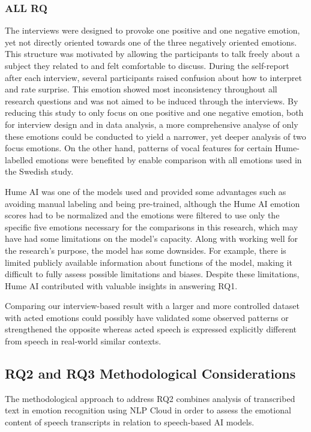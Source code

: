 \subsubsection{ALL RQ } 
The interviews were designed to provoke one positive and one negative emotion, yet not directly oriented towards one of the three negatively oriented emotions. This structure was motivated by allowing the participants to talk freely about a subject they related to and felt comfortable to discuss. During the self-report after each interview, several participants raised confusion about how to interpret and rate surprise. This emotion showed most inconsistency throughout all research questions and was not aimed to be induced through the interviews. By reducing this study to only focus on one positive and one negative emotion, both for interview design and in data analysis, a more comprehensive analyse of only these emotions could be conducted to yield a narrower, yet deeper analysis of two focus emotions. On the other hand, patterns of vocal features for certain Hume-labelled emotions were benefited by enable comparison with all emotions used in the Swedish study. 

Hume AI was one of the models used and provided some advantages such as avoiding manual
labeling and being pre-trained, although the Hume AI emotion scores had to be normalized and
the emotions were filtered to use only the specific five emotions necessary for the comparisons
in this research, which may have had some limitations on the model’s capacity. Along with
working well for the research’s purpose, the model has some downsides. For example, there is
limited publicly available information about functions of the model, making it diﬀicult to fully
assess possible limitations and biases. Despite these limitations, Hume AI contributed with valuable insights in answering RQ1.

Comparing our interview-based result with a larger and more controlled dataset with acted emotions could possibly have validated some observed patterns or strengthened the opposite whereas acted speech is expressed explicitly different from speech in real-world similar contexts. 

\subsection{RQ2 and RQ3 Methodological Considerations}
The methodological approach to address RQ2 combines analysis of transcribed text in emotion recognition using NLP Cloud in order to assess the emotional content of speech transcripts in relation to speech-based AI models.

